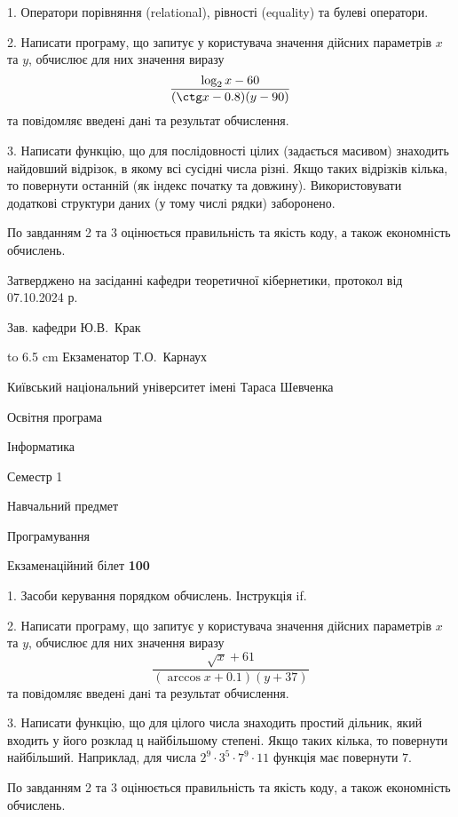 \documentclass[12pt, ukrainian]{article}
\begin{document}
{%
1. Оператори порівняння (relational), рівності (equality) та булеві оператори.%
\par
2. Написати програму, що запитує у користувача значення дійсних параметрів $x$ та $y$, обчислює для них значення виразу 
$$\frac{\log_{2} x - 60}{(\ctg x - 0.8) (y - 90)}$$ 
та повiдомляє введенi данi та результат обчислення.

\par
3. Написати функцію, що для послідовності цілих (задається масивом) знаходить найдовший відрізок, в якому всі сусідні числа різні. Якщо таких відрізків кілька, то повернути останній (як індекс початку та довжину). Використовувати додаткові структури даних (у тому числі рядки) заборонено.

По завданням 2 та 3 оцінюється правильність та якість коду, а також економність обчислень.

}
{\smallskip\smallskip \begin {scriptsize} Затверджено на засіданні кафедри теоретичної кібернетики, протокол   від   07.10.2024 р.\par\smallskip\smallskip\smallskip\smallskip
{\parbox {6.5 cm} {Зав. кафедри \dotfill Ю.В.~Крак}}\hspace {0.7cm} {\hbox to 6.5 cm { Екзаменатор \dotfill Т.О.~Карнаух}} \end{scriptsize}}
\newpage
{{\begin {scriptsize}\par
{ \center  Київський національний університет імені Тараса Шевченка \par}
{\parbox {5 cm}{Освітня програма \hfill}{\parbox {7 cm}{Інформатика\hfill}}\parbox {6 cm}{\hfill Семестр 1}}\par
{\parbox {5 cm} {Навчальний предмет \hfill}\parbox {7 cm}{Програмування \hfill}\parbox {6cm}{\hfill}\par}\vspace{-15pt} \end{scriptsize}}{\center Екзаменаційний білет \No \textbf { 100 }\par}}
{%
1. Засоби керування порядком обчислень. Інструкція if.%
\par
2. Написати програму, що запитує у користувача значення дійсних параметрів $x$ та $y$, обчислює для них значення виразу 
$$\frac{\sqrt x + 61}{(\arccos x + 0.1) (y + 37)}$$ 
та повiдомляє введенi данi та результат обчислення.

\par
3. Написати функцію, що для цілого числа знаходить простий дільник, який входить у його розклад ц найбільшому степені. Якщо таких кілька, то повернути найбільший. Наприклад, для числа $2^{9}{\cdot}3^5{\cdot}7^9{\cdot}11$ функція має повернути $7$.

По завданням 2 та 3 оцінюється правильність та якість коду, а також економність обчислень.

}
\end{document}
